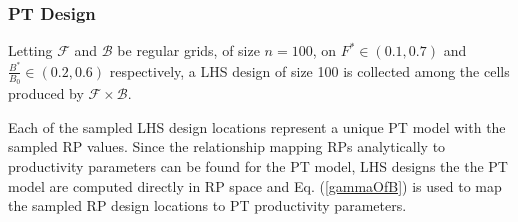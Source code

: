 \documentclass[12pt]{article}
\begin{document}
%
 

%
\subsubsection{PT Design}

%
Letting $\mathcal{F}$ and $\mathcal{B}$ be regular grids, of size $n=100$, on
\mbox{$F^*\in(0.1, 0.7)$} and \mbox{$\frac{B^*}{B_0}\in(0.2, 0.6)$}
respectively, a LHS design of size 100 is collected among the cells produced by
$\mathcal{F}\times\mathcal{B}$. 

%
Each of the sampled LHS design locations represent a unique PT model with the 
sampled RP values. Since the relationship mapping RPs analytically to productivity 
parameters can be found for the PT model, LHS designs the the PT model are 
computed directly in RP space and Eq. (\ref{gammaOfB}) is used to map the 
sampled RP design locations to PT productivity parameters. 
%
%


\end{document}
